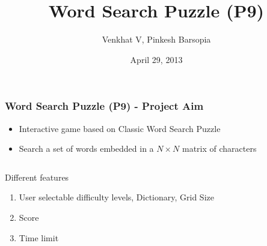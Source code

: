 \documentclass{beamer}
\begin{document}
\title{Word Search Puzzle (P9)}  
\author{Venkhat V, Pinkesh Barsopia}
\date{April 29, 2013} 

\begin{frame}
\titlepage
\end{frame}



\begin{frame}\frametitle{Word Search Puzzle (P9) - Project Aim }
\begin{itemize}
 \item Interactive game based on Classic Word Search Puzzle
\item Search a set of words embedded in a $N \times N$ matrix of characters

\end{itemize}
\pause
\begin{columns}[c]
\begin{column}{5cm}
\begin{block}{Different features}
\begin{enumerate}
\item User selectable difficulty levels, Dictionary, Grid Size
\item Score
\item Time limit
\end{enumerate}
\end{block}
\end{column}

\begin{column}{5cm}


\end{column}
\end{columns}
\end{frame}
\end{document}
